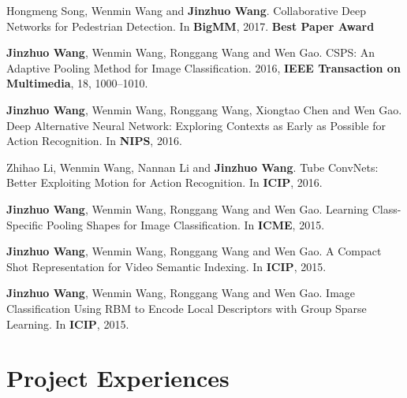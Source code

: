 \documentclass[letterpaper]{article}
\renewenvironment{itemize}{
  \begin{list}{}{
    \setlength{\leftmargin}{1.5em}
  }
}{
  \end{list}
}
\begin{document}
\begin{itemize}
\item[9.] Hongmeng Song, Wenmin Wang and \textbf{Jinzhuo Wang}. Collaborative Deep Networks for Pedestrian Detection. In \textbf{BigMM}, 2017. \textbf{Best Paper Award}

\item[10.] \textbf{Jinzhuo Wang}, Wenmin Wang, Ronggang Wang and Wen Gao. CSPS: An Adaptive Pooling Method for Image Classification. 2016, \textbf{IEEE Transaction on Multimedia}, 18, 1000--1010.

\item[11.] \textbf{Jinzhuo Wang}, Wenmin Wang, Ronggang Wang, Xiongtao Chen and Wen Gao. Deep Alternative Neural Network: Exploring Contexts as Early as Possible for Action Recognition. In \textbf{NIPS}, 2016.

\item[12.] Zhihao Li, Wenmin Wang, Nannan Li and \textbf{Jinzhuo Wang}. Tube ConvNets: Better Exploiting Motion for Action Recognition. In \textbf{ICIP}, 2016.

\item[13.] \textbf{Jinzhuo Wang}, Wenmin Wang, Ronggang Wang and Wen Gao. Learning Class-Specific Pooling Shapes for Image Classification. In \textbf{ICME}, 2015.

\item[14.] \textbf{Jinzhuo Wang}, Wenmin Wang, Ronggang Wang and Wen Gao. A Compact Shot Representation for Video Semantic Indexing. In \textbf{ICIP}, 2015.

\item[15.] \textbf{Jinzhuo Wang}, Wenmin Wang, Ronggang Wang and Wen Gao. Image Classification Using RBM to Encode Local Descriptors with Group Sparse Learning. In \textbf{ICIP}, 2015.

\end{itemize}

\section*{Project Experiences}
\end{document}
